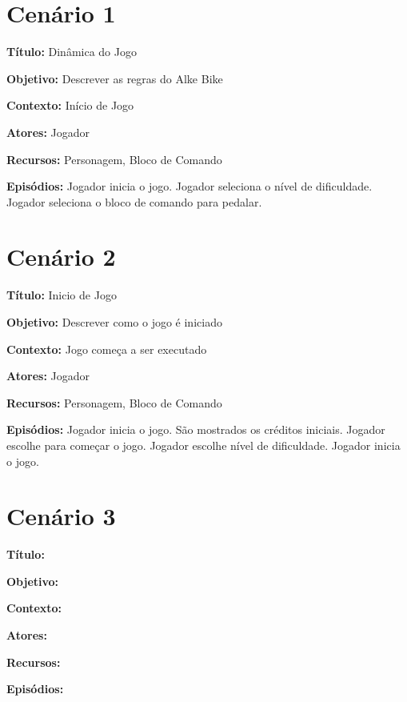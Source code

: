 \section{Cenário 1}

\textbf{Título:} Dinâmica do Jogo 

\textbf{Objetivo:} Descrever as regras do Alke Bike 

\textbf{Contexto:} Início de Jogo

\textbf{Atores:} Jogador

\textbf{Recursos:} Personagem, Bloco de Comando

\textbf{Episódios:} Jogador inicia o jogo. Jogador seleciona o nível de dificuldade. Jogador seleciona o bloco de comando para pedalar.

\section{Cenário 2}

\textbf{Título:} Inicio de Jogo

\textbf{Objetivo:} Descrever como o jogo é iniciado 

\textbf{Contexto:} Jogo começa a ser executado 

\textbf{Atores:} Jogador

\textbf{Recursos:} Personagem, Bloco de Comando

\textbf{Episódios:} Jogador inicia o jogo. São mostrados os créditos iniciais. Jogador escolhe para começar o jogo. Jogador escolhe nível de dificuldade. Jogador inicia o jogo.

\section{Cenário 3}

\textbf{Título:} 

\textbf{Objetivo:}

\textbf{Contexto:}

\textbf{Atores:}

\textbf{Recursos:}

\textbf{Episódios:}